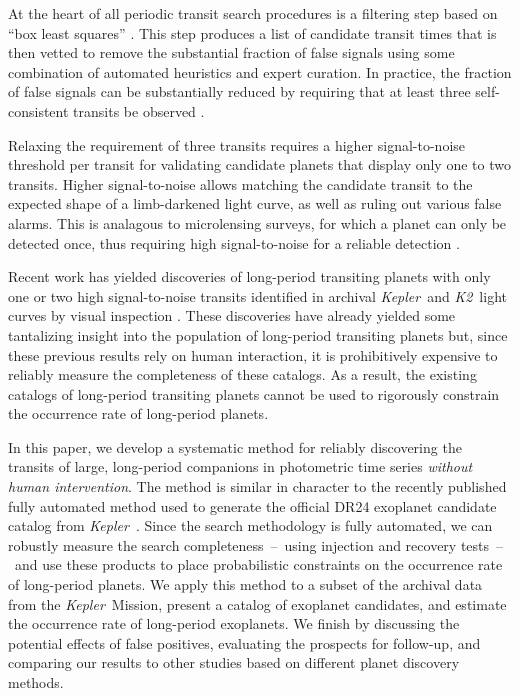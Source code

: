 \documentclass[manuscript, letterpaper]{aastex6}
\newcommand{\project}[1]{\textsl{#1}}
\newcommand{\kepler}{\project{Kepler}}
\newcommand{\KT}{\project{K2}}
\newcommand{\bls}{\project{BLS}}
\newcommand{\paper}{paper}
\begin{document}
At the heart of all periodic transit search procedures is a filtering step
based on ``box least squares'' \citep[\bls;][]{Kovacs:2002}.
This step produces a list of candidate transit times that is then vetted to
remove the substantial fraction of false signals using some combination of
automated heuristics and expert curation.
In practice, the fraction of false signals can be substantially reduced by
requiring that at least three self-consistent transits be observed
\citep{Petigura:2013, Burke:2014, Rowe:2015, Coughlin:2016}.

Relaxing the requirement of three transits requires a higher signal-to-noise
threshold per transit for validating candidate planets that display only one
to two transits.
Higher signal-to-noise allows matching the candidate transit to the expected
shape of a limb-darkened light curve, as well as ruling out various false
alarms.  This is analagous to microlensing surveys, for which a planet can only be
detected once, thus requiring high signal-to-noise for a reliable detection
\citep{Gould:2004}.

Recent work has yielded discoveries of long-period transiting planets with
only one or two high signal-to-noise transits identified in archival \kepler\
and \KT\ light curves by visual inspection \citep{Wang:2013, Kipping:2014a,
Wang:2015, Osborn:2016, Kipping:2016, Uehara:2016}.
These discoveries have already yielded some tantalizing insight into the
population of long-period transiting planets but, since these previous results
rely on human interaction, it is prohibitively expensive to reliably measure
the completeness of these catalogs.
As a result, the existing catalogs of long-period transiting planets cannot be
used to rigorously constrain the occurrence rate of long-period planets.

In this \paper, we develop a systematic method for reliably discovering the
transits of large, long-period companions in photometric time series
\emph{without human intervention}.
The method is similar in character to the recently published fully automated
method used to generate the official DR24 exoplanet candidate catalog from
\kepler\ \citep{Mullally:2016, Coughlin:2016}.
Since the search methodology is fully automated, we can robustly measure the
search completeness~--~using injection and recovery tests~--~and use these
products to place probabilistic constraints on the occurrence rate of
long-period planets.
We apply this method to a subset of the archival data from the \kepler\
Mission, present a catalog of exoplanet candidates, and estimate the
occurrence rate of long-period exoplanets.
We finish by discussing the potential effects of false positives, evaluating the
prospects for follow-up, and comparing our results to other studies
based on different planet discovery methods.
\end{document}
